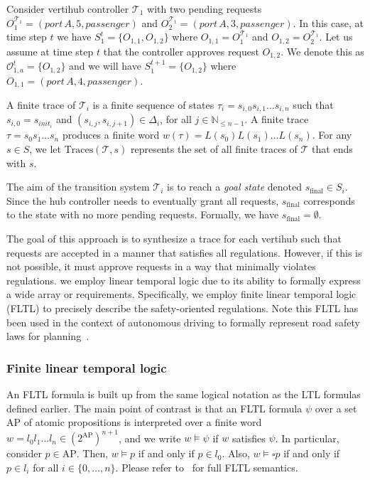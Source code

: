 \begin{eg}
Consider vertihub controller $\mathcal{T}_1$ with two pending requests $O^{\mathcal{T}_1}_1 = \left(port\, A, 5, passenger \right)$ and $O^{\mathcal{T}_1}_2= \left(port\, A, 3, passenger \right)$. In this case, at time step $t$ we have $S_1^t = \{O_{1,1},O_{1,2}\}$ where $O_{1,1} = O^{\mathcal{T}_1}_1$ and $O_{1,2} = O^{\mathcal{T}_1}_2$. Let us assume at time step $t$ that the controller approves request $O_{1,2}$. We denote this as $\mathcal{O}^{t}_{1,a} = \{O_{1,2} \}$ and we will have $S^{t+1}_1 = \{O_{1,2}\}$ where $ O_{1,1} = \left(port\, A, 4, passenger \right)$. 
\end{eg}


A finite trace of $\mathcal{T}_i$ is a finite sequence of states $\tau_i = s_{i,0} s_{i,1} \ldots s_{i,n}$ such that
$s_{i,0} = s_{\textit{init}_i}$ and $(s_{i,j}, s_{i,j+1}) \in \Delta_i$, for all $j \in \mathbb{N}_{\leq n-1}$.
A finite trace $\tau = s_0 s_1 \ldots s_n$ produces a finite word $w(\tau) = L(s_0) L(s_1) \ldots L(s_n)$. For any $s \in S$, we let $\text{Traces}(\mathcal{T}, s)$ represents the set of all finite traces of $\mathcal{T}$ that ends with $s$.

The aim of the transition system $\mathcal{T}_i$ is to reach a \emph{goal state} denoted $s_{\text{final}} \in S_i$. Since the hub controller needs to eventually grant all requests, $s_{\text{final}}$ corresponds to the state with no more pending requests. Formally, we have $s_{\text{final}} = \emptyset$.  

The goal of this approach is to synthesize a trace for each vertihub such that requests are accepted in a manner that satisfies all regulations. However, if this is not possible, it must approve requests in a way that minimally violates regulations. we employ linear temporal logic due to its ability to formally express a wide array or requirements. Specifically, we employ finite linear temporal logic (FLTL) to precisely describe the safety-oriented regulations. Note this FLTL has been used in the context of autonomous driving to formally represent road safety laws for planning~\cite{Tumova:2013:ACC,Tumova:2013:LCS}. 

\subsubsection{Finite linear temporal logic}
An FLTL formula is built up from the same logical notation as the LTL formulas defined earlier. The main point of contrast is that an FLTL formula $\psi$ over a set $\text{AP}$ of atomic propositions is interpreted over a finite word
$w = l_0 l_1 \ldots l_n \in (2^{\text{AP}})^{n+1}$,
and we write $w \models \psi$ if $w$ satisfies $\psi$.
In particular, consider $p \in \text{AP}$. Then,
$w \models p$ if and only if $p \in l_0$. Also,
$w \models \square p$
if and only if $p \in l_i$ for all $i \in \{0, \ldots, n\}$. Please refer to~\cite{gunter2002temporal} for full FLTL semantics. 

